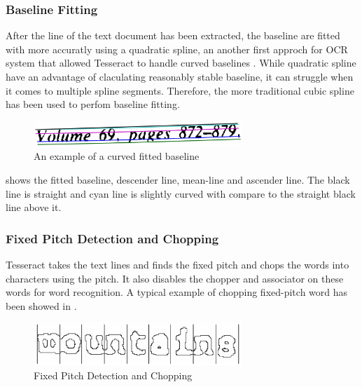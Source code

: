 \subsubsection{Baseline Fitting}

After the line of the text document has been extracted, the baseline are fitted with more accuratly using a quadratic spline, an another first approch for OCR system that allowed Tesseract to handle curved baselines \cite{quadratic_spline_algorithm}. While quadratic spline have an advantage of claculating reasonably stable baseline, it can struggle when it comes to multiple spline segments. Therefore, the more traditional cubic spline \cite{Traditional_cubic_algorithm} has been used to perfom baseline fitting.

\begin{figure}[h]
    \centering
    \includegraphics[width=0.7\textwidth]{chapters/images/OCR/Base_Line_Fitting.JPG}
    \caption{An example of a curved fitted baseline \cite{AnOverviewoftheTesseractOCREngine}}
    \label{fig:Baseline_Fitting}
\end{figure}

 shows the fitted baseline, descender line, mean-line and ascender line. The black line is straight and cyan line is slightly curved with compare to the straight black line above it.

\subsubsection{Fixed Pitch Detection and Chopping}

Tesseract takes the text lines and finds the fixed pitch and chops the words into characters using the pitch. It also disables the chopper and associator on these words for word recognition. A typical example of chopping fixed-pitch word has been showed in .

\begin{figure}[ht]
    \centering
    \includegraphics[width=0.7\textwidth]{chapters/images/OCR/Fixed_Pitch_detection.JPG}
    \caption{Fixed Pitch Detection and Chopping\cite{AnOverviewoftheTesseractOCREngine}}
    \label{fig:Fixed_Pitch_detection}
\end{figure}

